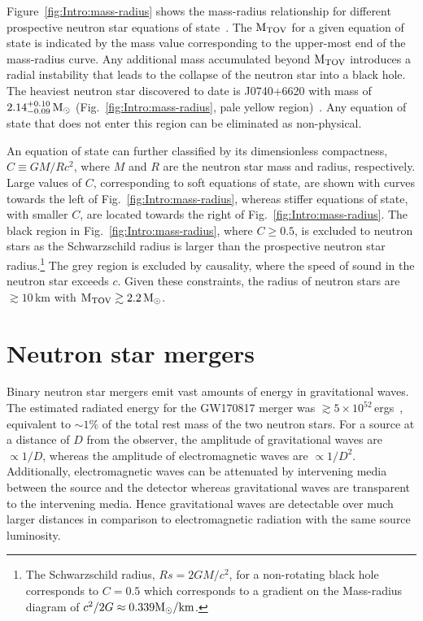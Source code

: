 \documentclass[../Thesis.tex]{subfiles}
\begin{document}
    Figure~\ref{fig:Intro:mass-radius} shows the mass-radius relationship for different prospective neutron star equations of state~\cite{Hu2020}. 
    The $\mathrm{M_{TOV}}$ for a given equation of state is indicated by the mass value corresponding to the upper-most end of the mass-radius curve.
    Any additional mass accumulated beyond $\mathrm{M_{TOV}}$ introduces a radial instability that leads to the collapse of the neutron star into a black hole.
    The heaviest neutron star  discovered to date is J0740+6620 with mass of $2.14^{+0.10}_{-0.09}\,\mathrm{M}_{\odot}$ (Fig.~\ref{fig:Intro:mass-radius}, pale yellow region)~\cite{Cromartie2020}.
    Any equation of state that does not enter this region can be eliminated as non-physical. \par
    
    An equation of state can further classified by its dimensionless compactness, $C\equiv GM/Rc^2$, where $M$ and $R$ are the neutron star mass and radius, respectively.
    Large values of $C$, corresponding to soft equations of state, are shown with curves towards the left of Fig.~\ref{fig:Intro:mass-radius}, whereas stiffer equations of state, with smaller $C$, are located towards the right of Fig.~\ref{fig:Intro:mass-radius}.
    The black region in Fig.~\ref{fig:Intro:mass-radius}, where $C\geqslant 0.5$, is excluded to neutron stars as the Schwarzschild radius is larger than the prospective neutron star radius.\footnote{The Schwarzschild radius, $Rs = 2GM/c^2$, for a non-rotating black hole corresponds to $C=0.5$ which corresponds to a gradient on the Mass-radius diagram of $c^2/2G \approx 0.339 \mathrm{M}_{\odot}/\mathrm{km}$.}
    The grey region is excluded by causality, where the speed of sound in the neutron star exceeds $c$.
    Given these constraints, the radius of neutron stars are $\gtrsim 10\,$km with $\mathrm{M_{TOV}} \gtrsim 2.2\, \mathrm{M}_{\odot}$. 
    

    \section{Neutron star mergers} \label{sec:Intro:NeutronStarMergers}
    Binary neutron star mergers emit vast amounts of energy in gravitational waves.
    The estimated radiated energy for the GW170817 merger was $\gtrsim 5\times 10^{52}\,$ergs~\cite{GW170817Detection}, equivalent to $\sim 1\%$ of the total rest mass of the two neutron stars.
    For a source at a distance of $D$ from the observer, the amplitude of gravitational waves are  $\propto 1/D$, whereas the amplitude of electromagnetic waves are $\propto 1/D^2$.
    Additionally, electromagnetic waves can be attenuated by intervening media between the source and the detector whereas gravitational waves are transparent to the intervening media.
    Hence gravitational waves are detectable over much larger distances in comparison to electromagnetic radiation with the same source luminosity. \par
    
\end{document}
